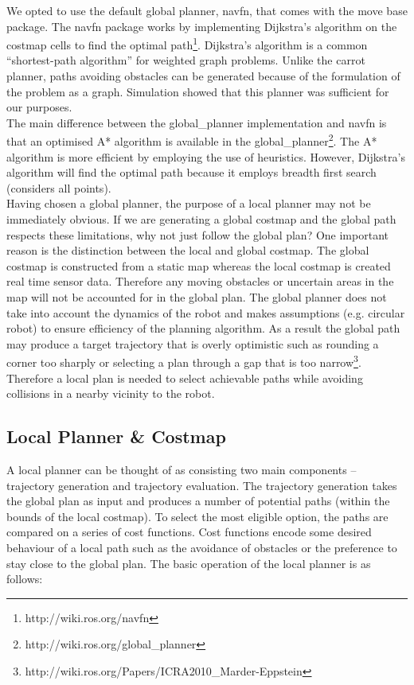 \documentclass[capstone_report.tex]{subfiles}
\begin{document}
We opted to use the default global planner, navfn, that comes with the move base package. The navfn package works by implementing Dijkstra’s algorithm on the costmap cells to find the optimal path\footnote{http://wiki.ros.org/navfn}.  Dijkstra’s algorithm is a common “shortest-path algorithm” for weighted graph problems.   Unlike the carrot planner, paths avoiding obstacles can be generated because of the formulation of the problem as a graph.  Simulation showed that this planner was sufficient for our purposes.\\

The main difference between the global\_planner implementation and navfn is that an optimised A* algorithm is available in the global\_planner\footnote{http://wiki.ros.org/global\_planner}.  The A* algorithm is more efficient by employing the use of heuristics.  However, Dijkstra’s algorithm will find the optimal path because it employs breadth first search (considers all points).\\

Having chosen a global planner, the purpose of a local planner may not be immediately obvious.  If we are generating a global costmap and the global path respects these limitations, why not just follow the global plan?  One important reason is the distinction between the local and global costmap.  The global costmap is constructed from a static map whereas the local costmap is created real time sensor data.  Therefore any moving obstacles or uncertain areas in the map will not be accounted for in the global plan.  The global planner does not take into account the dynamics of the robot and makes assumptions (e.g. circular robot) to ensure efficiency of the planning algorithm.  As a result the global path may produce a target trajectory that is overly optimistic such as rounding a corner too sharply or selecting a plan through a gap that is too narrow\footnote{http://wiki.ros.org/Papers/ICRA2010\_Marder-Eppstein}.  Therefore a local plan is needed to select achievable paths while avoiding collisions in a nearby vicinity to the robot.

\subsection{Local Planner \& Costmap}

A local planner can be thought of as consisting two main components – trajectory generation and trajectory evaluation.  The trajectory generation takes the global plan as input and produces a number of potential paths (within the bounds of the local costmap).  To select the most eligible option, the paths are compared on a series of cost functions.   Cost functions encode some desired behaviour of a local path such as the avoidance of obstacles or the preference to stay close to the global plan.  The basic operation of the local planner is as follows:
\end{document}
